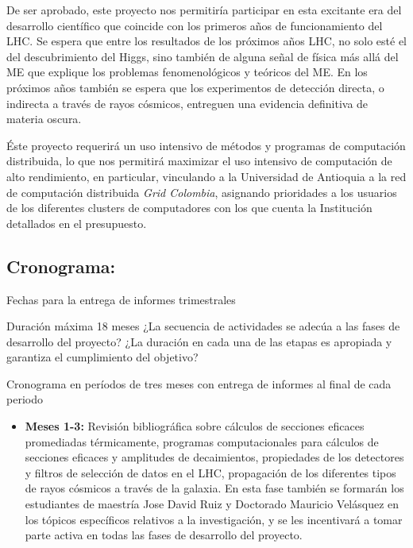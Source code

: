 \begin{bbrpvlhc}
De ser aprobado, este proyecto nos permitiría participar en esta
excitante era del desarrollo científico que coincide con los primeros
años de funcionamiento del LHC.  Se espera que entre los resultados de
los próximos años LHC, no solo esté el del descubrimiento del Higgs,
sino también de alguna señal de física más allá del ME que explique
los problemas fenomenológicos y teóricos del ME. En los próximos años
también se espera que los experimentos de detección directa, o
indirecta a través de rayos cósmicos, entreguen una evidencia
definitiva de materia oscura.


Éste proyecto requerirá un uso intensivo de métodos y programas de
computación distribuida, lo que nos permitirá maximizar el uso
intensivo de computación de alto rendimiento, en particular,
vinculando a la Universidad de Antioquia a la red de computación
distribuida \emph{Grid Colombia}, asignando prioridades a los usuarios
de los diferentes clusters de computadores con los que cuenta la
Institución detallados en el presupuesto.

\subsection{Cronograma:                                    }
\begin{evaluacion}
  Fechas para la entrega de informes trimestrales
\end{evaluacion}

\begin{instrucciones}
Duración máxima 18 meses
  ¿La secuencia de actividades se adecúa a las fases de desarrollo del proyecto? ¿La duración en cada una de las etapas es apropiada y garantiza el cumplimiento del objetivo?
\end{instrucciones}
Cronograma en períodos de tres meses con entrega de informes al final
de cada periodo

\begin{itemize}
\item \textbf{Meses 1-3:} Revisión bibliográfica sobre cálculos de
  secciones eficaces promediadas térmicamente, programas
  computacionales para cálculos de secciones eficaces y amplitudes de
  decaimientos, propiedades de los detectores y filtros de selección
  de datos en el LHC, propagación de los diferentes tipos de rayos
  cósmicos a través de la galaxia.  En esta fase también se formarán los
  estudiantes  de maestría Jose David Ruiz y Doctorado Mauricio
  Velásquez en los tópicos específicos relativos a la
  investigación, y se les incentivará a tomar parte activa en todas las
  fases de desarrollo del proyecto.


\end{itemize}
\end{bbrpvlhc}
